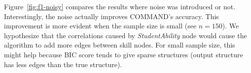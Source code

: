 \documentclass{edm_template}
\newcommand{\hl}[1]{\colorbox{yellow}{#1}}
\begin{document}
	Figure~\ref{fig:f1-noisy} compares the results where noise was introduced or not.
	Interestingly, the noise  actually improves COMMAND's  accuracy.
	This improvement is more evident when the sample size is small (see $n=150$).
	We hypothesize that the correlations caused by \emph{StudentAbility} node would cause the algorithm to add more edges between skill nodes.
	For small sample size, this might help because BIC score tends to give sparse structures (output structure has less edges than the true structure).

	
\end{document}

